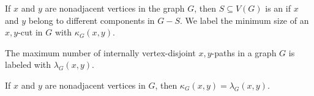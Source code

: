 
\begin{definition}
  If $x$ and $y$ are nonadjacent vertices in the graph $G$, then $S \subseteq
  V(G)$ is an  if $x$ and $y$ belong to different components in
  $G - S$.
  We label the minimum size of an $x,y$-cut in $G$ with $\kappa_G(x,y)$.
\end{definition}

\begin{definition}
  The maximum number of internally vertex-disjoint $x,y$-paths in a graph $G$ is
  labeled with $\lambda_G(x,y)$.
\end{definition}

\begin{theorem}
  If $x$ and $y$ are nonadjacent vertices in $G$, then $\kappa_G(x,y) =
  \lambda_G(x,y)$.
\end{theorem}

